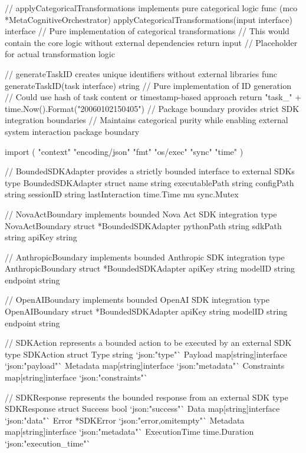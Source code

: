 // applyCategoricalTransformations implements pure categorical logic
func (mco *MetaCognitiveOrchestrator) applyCategoricalTransformations(input interface{}) interface{} {
    // Pure implementation of categorical transformations
    // This would contain the core logic without external dependencies
    return input // Placeholder for actual transformation logic
}

// generateTaskID creates unique identifiers without external libraries
func generateTaskID(task interface{}) string {
    // Pure implementation of ID generation
    // Could use hash of task content or timestamp-based approach
    return "task_" + time.Now().Format("20060102150405")
}
// Package boundary provides strict SDK integration boundaries
// Maintains categorical purity while enabling external system interaction
package boundary

import (
    "context"
    "encoding/json"
    "fmt"
    "os/exec"
    "sync"
    "time"
)

// BoundedSDKAdapter provides a strictly bounded interface to external SDKs
type BoundedSDKAdapter struct {
    name          string
    executablePath string
    configPath    string
    sessionID     string
    lastInteraction time.Time
    mu            sync.Mutex
}

// NovaActBoundary implements bounded Nova Act SDK integration
type NovaActBoundary struct {
    *BoundedSDKAdapter
    pythonPath    string
    sdkPath       string
    apiKey        string
}

// AnthropicBoundary implements bounded Anthropic SDK integration
type AnthropicBoundary struct {
    *BoundedSDKAdapter
    apiKey        string
    modelID       string
    endpoint      string
}

// OpenAIBoundary implements bounded OpenAI SDK integration
type OpenAIBoundary struct {
    *BoundedSDKAdapter
    apiKey        string
    modelID       string
    endpoint      string
}

// SDKAction represents a bounded action to be executed by an external SDK
type SDKAction struct {
    Type        string                 `json:"type"`
    Payload     map[string]interface{} `json:"payload"`
    Metadata    map[string]interface{} `json:"metadata"`
    Constraints map[string]interface{} `json:"constraints"`
}

// SDKResponse represents the bounded response from an external SDK
type SDKResponse struct {
    Success     bool                   `json:"success"`
    Data        map[string]interface{} `json:"data"`
    Error       *SDKError             `json:"error,omitempty"`
    Metadata    map[string]interface{} `json:"metadata"`
    ExecutionTime time.Duration        `json:"execution_time"`
}

